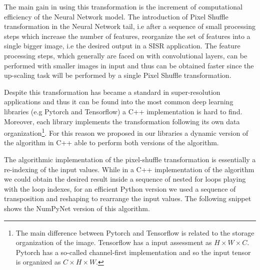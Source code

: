 \documentclass{standalone}
\begin{document}
The main gain in using this transformation is the increment of computational efficiency of the Neural Network model.
The introduction of Pixel Shuffle transformation in the Neural Network tail, i.e after a sequence of small processing steps which increase the number of features, reorganize the set of features into a single bigger image, i.e the desired output in a SISR application.
The feature processing steps, which generally are faced on with convolutional layers, can be performed with smaller images in input and thus can be obtained faster since the up-scaling task will be performed by a single Pixel Shuffle transformation.

Despite this transformation has became a standard in super-resolution applications and thus it can be found into the most common deep learning libraries (e.g \textsf{Pytorch} and \textsf{Tensorflow}) a \textsf{C++} implementation is hard to find.
Moreover, each library implements the transformation following its own data organization\footnote{
  The main difference between \textsf{Pytorch} and \textsf{Tensorflow} is related to the storage organization of the image.
  \textsf{Tensorflow} has a  input assessment as $H \times W \times C$.
  \textsf{Pytorch} has a so-called channel-first implementation and so the input tensor is organized as $C \times H \times W$.
}.
For this reason we proposed in our libraries a dynamic version of the algorithm in \textsf{C++} able to perform both versions of the algorithm.

The algorithmic implementation of the pixel-shuffle transformation is essentially a re-indexing of the input values.
While in a \textsf{C++} implementation of the algorithm we could obtain the desired result inside a sequence of nested for loops playing with the loop indexes, for an efficient Python version we used a sequence of transposition and reshaping to rearrange the input values.
The following snippet shows the NumPyNet version of this algorithm.
\end{document}
